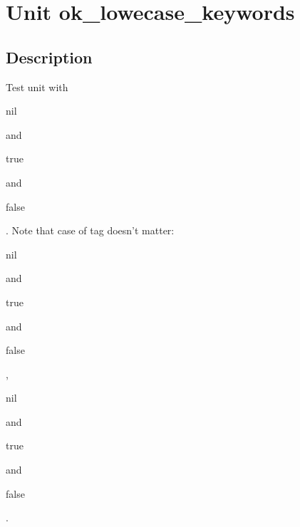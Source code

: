 \documentclass{report}
\begin{document}
\newlength{\tmplength}
\chapter{Unit ok{\_}lowecase{\_}keywords}
\section{Description}
Test unit with \begin{ttfamily}nil\end{ttfamily} and \begin{ttfamily}true\end{ttfamily} and \begin{ttfamily}false\end{ttfamily}. Note that case of tag doesn't matter: \begin{ttfamily}nil\end{ttfamily} and \begin{ttfamily}true\end{ttfamily} and \begin{ttfamily}false\end{ttfamily} , \begin{ttfamily}nil\end{ttfamily} and \begin{ttfamily}true\end{ttfamily} and \begin{ttfamily}false\end{ttfamily} .
\end{document}
